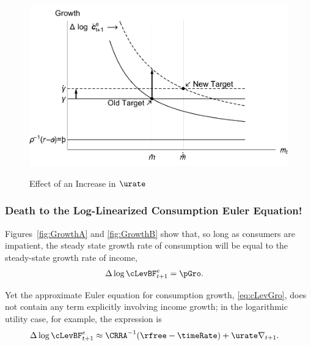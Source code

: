 \documentclass{handout}
\begin{document}
\begin{figure}
\caption{Effect of an Increase in $\urate$}
\includegraphics[width=6in]{../Figures/cGroIncreaseMhoPlot}
\label{fig:cGroIncreaseMhoPlot}
\end{figure}

\subsubsection{Death to the Log-Linearized Consumption Euler Equation!}

Figures~\ref{fig:GrowthA} and \ref{fig:GrowthB} show that, so long as
consumers are impatient, the steady state growth rate of consumption
will be equal to the steady-state growth rate of income,
\begin{equation}\begin{gathered}\begin{aligned}
        \Delta \log \cLevBF^{e}_{t+1} & =  \pGro. \label{eq:ceqg}
\end{aligned}\end{gathered}\end{equation}

Yet the approximate Euler equation for consumption growth, \eqref{eq:cLevGro}, does 
not contain any term explicitly involving income growth; in the logarithmic utility
case, for example, the expression is
\begin{equation}\begin{gathered}\begin{aligned}
         \Delta \log \cLevBF^{e}_{t+1} & \approx  \CRRA^{-1}(\rfree-\timeRate) +  \urate \nabla _{t+1}. \label{eq:cdelapprox2}
\end{aligned}\end{gathered}\end{equation}
\end{document}
